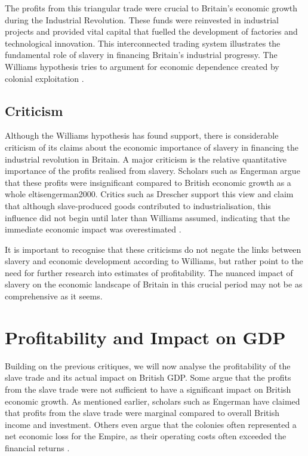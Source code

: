 \documentclass[a4paper,11pt]{article}
\begin{document}
The profits from this triangular trade were crucial to Britain's economic growth during the Industrial Revolution. These funds were reinvested in industrial projects and provided vital capital that fuelled the development of factories and technological innovation. This interconnected trading system illustrates the fundamental role of slavery in financing Britain's industrial progressy. The Williams hypothesis tries to argument for economic dependence created by colonial exploitation \citep{solow1985}.

\subsection{Criticism}

Although the Williams hypothesis has found support, there is considerable criticism of its claims about the economic importance of slavery in financing the industrial revolution in Britain. A major criticism is the relative quantitative importance of the profits realised from slavery. Scholars such as Engerman argue that these profits were insignificant compared to British economic growth as a whole {eltisengerman2000}. Critics such as Drescher support this view and claim that although slave-produced goods contributed to industrialisation, this influence did not begin until later than Williams assumed, indicating that the immediate economic impact was overestimated \citep{drescher1997}.

It is important to recognise that these criticisms do not negate the links between slavery and economic development according to Williams, but rather point to the need for further research into estimates of profitability. The nuanced impact of slavery on the economic landscape of Britain in this crucial period may not be as comprehensive as it seems.

\section{Profitability and Impact on GDP}

Building on the previous critiques, we will now analyse the profitability of the slave trade and its actual impact on British GDP. Some argue that the profits from the slave trade were not sufficient to have a significant impact on British economic growth. As mentioned earlier, scholars such as Engerman have claimed that profits from the slave trade were marginal compared to overall British income and investment. Others even argue that the colonies often represented a net economic loss for the Empire, as their operating costs often exceeded the financial returns \citep{eltisengerman2000}.
\end{document}

